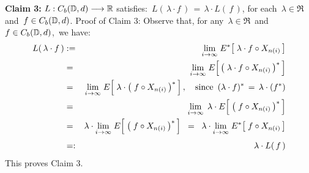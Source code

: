 \vskip 0.5cm
\noindent
\textbf{Claim 3:}\;\;
$L : C_{b}(\mathbb{D},d) \longrightarrow \mathbb{R}$ satisfies:\,
$L(\,\lambda\cdot f\,) \,=\, \lambda \cdot L(\,f\,)$,\;
for each \,$\lambda \in \Re$\, and \,$f \in C_{b}(\mathbb{D},d)$.
\vskip 0.2cm
\noindent
Proof of Claim 3:\;\;
Observe that, for any \,$\lambda \in \Re$\, and \,$f \in C_{b}(\mathbb{D},d)$,\, we have:
\begin{eqnarray*}
L(\,\lambda \cdot f\,)
&:=&
	\underset{i\rightarrow\infty}{\lim}\;
	E^{*}\!\left[\; \lambda \cdot f \circ X_{n(i)} \,\right]
\\
& \overset{{\color{white}1}}{=} &
	\underset{i\rightarrow\infty}{\lim}\;
	E\!\left[\,\left(\; \lambda \cdot f \circ X_{n(i)} \,\right)^{*}\,\right]
\\
& \overset{{\color{white}1}}{=} &
	\underset{i\rightarrow\infty}{\lim}\;
	E\!\left[\; \lambda \cdot \left(\; f \circ X_{n(i)}\,\right)^{*} \,\right],
	\quad
	\textnormal{since \,$(\lambda \cdot f)^{*} \,=\, \lambda \cdot (f^{*})$}
\\
& \overset{{\color{white}1}}{=} &
	\underset{i\rightarrow\infty}{\lim}\;\,
	\lambda \cdot E\!\left[\;\left(\; f \circ X_{n(i)}\,\right)^{*} \,\right]
\\
& \overset{{\color{white}1}}{=} &
	\lambda \cdot
	\underset{i\rightarrow\infty}{\lim}\;
	E\!\left[\;\left(\; f \circ X_{n(i)}\,\right)^{*} \,\right]
\;\; = \;\;
	\lambda \cdot
	\underset{i\rightarrow\infty}{\lim}\;
	E^{*}\!\left[\; f \circ X_{n(i)} \,\right]
\\
& \overset{{\color{white}1}}{=:} &
	\lambda \cdot L(\,f\,)
\end{eqnarray*}
This proves Claim 3.

